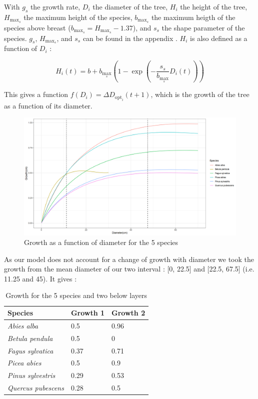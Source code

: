 \documentclass{article}
\begin{document}
With $g_s$ the growth rate, $D_i$ the diameter of the tree, $H_i$ the height of the tree, $H_{\max _s}$ the maximum height of the species, $b_{\max _s}$ the maximum heigth of the species above breast ($b_{\max _s} =  H_{\max _s} - 1.37$), and $s_s$ the shape parameter of the species. $g_s$, $H_{\max _s}$, and $s_s$ can be found in the appendix  \autocite{morinForestSuccessionGap2021}. $H_i$ is also defined as a function of $D_i$ :

\begin{equation}
    H_i(t)=b+b_{\max _s}\left(1-\exp \left(-\frac{s_s}{b_{\max _s}} D_i(t)\right)\right)
    \label{eq:height}
\end{equation}

This gives a function $f(D_i) = \Delta D_{\mathrm{opt}_i}(t+1)$, which is the growth of the tree as a function of its diameter.

\begin{figure}
    \centering
    \includegraphics[width=\textwidth]{Figure/Parametrisation/Growth_diameter.png}
    \caption{Growth as a function of diameter for the 5 species}
    \label{fig:growth_diameter}
\end{figure}

As our model does not account for a change of growth with diameter we took the growth from the mean diameter of our two interval : [0, 22.5] and [22.5, 67.5] (i.e. 11.25 and 45). It gives :

\begin{table}[H]
\begin{center}
    \begin{tabular}{lll}
    \hline
    Species & Growth 1 & Growth 2 \\ \hline
    \textit{Abies alba} & 0.5 & 0.96 \\
    \textit{Betula pendula} & 0.5 & 0 \\
    \textit{Fagus sylvatica} & 0.37 & 0.71 \\
    \textit{Picea abies} & 0.5 & 0.9 \\
    \textit{Pinus sylvestris} & 0.29 & 0.53 \\
    \textit{Quercus pubescens} & 0.28 & 0.5 \\ \hline
    \end{tabular}
    \caption{Growth for the 5 species and two below layers}
\end{center}
\end{table}
\end{document}
